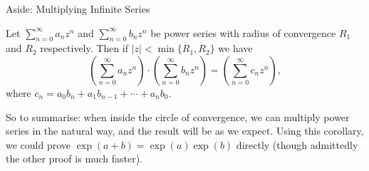 \documentclass[a4paper]{scrartcl}
\begin{document}
\begin{aside}{Aside: Multiplying Infinite Series}
\begin{corollary*}
	Let $\sum_{n = 0}^{\infty} a_n z^n$ and $\sum_{n = 0}^{\infty} b_n z^n$ be power series with radius of convergence $R_1$ and $R_2$ respectively. Then if $|z| < \min\{R_1, R_2\}$ we have
	$$
	\left(\sum_{n = 0}^{\infty} a_n z^n\right) \cdot \left(\sum_{n = 0}^{\infty} b_n z^n\right) = \left(\sum_{n = 0}^{\infty} c_n z^n\right),
	$$
	where $c_n = a_0 b_n + a_1 b_{n - 1} + \cdots + a_n b_0$.
\end{corollary*}

So to summarise: when inside the circle of convergence, we can multiply power series in the natural way, and the result will be as we expect. Using this corollary, we could prove $\exp(a + b) = \exp(a) \exp(b)$ directly (though admittedly the other proof is much faster).





\end{aside}
\end{document}
